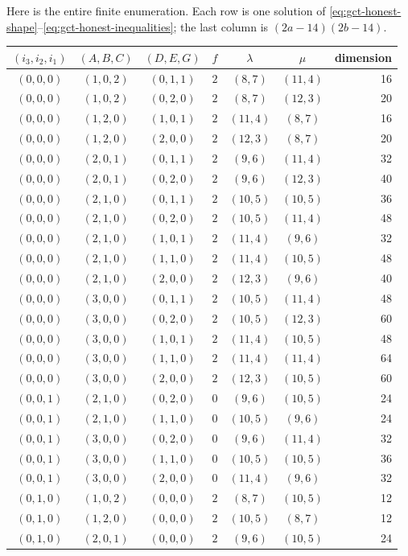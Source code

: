 Here is the entire finite enumeration. Each row is one solution of
\eqref{eq:gct-honest-shape}--\eqref{eq:gct-honest-inequalities};
the last column is $(2a-14)(2b-14)$.
\begin{center}\small
\begin{tabular}{ccccccr}
\toprule
$(i_3,i_2,i_1)$ & $(A,B,C)$ & $(D,E,G)$ & $f$ & $\lambda$ & $\mu$ & dimension\\
\midrule
$(0,0,0)$ & $(1,0,2)$ & $(0,1,1)$ & $2$ & $(8,7)$ & $(11,4)$ & 16\\
$(0,0,0)$ & $(1,0,2)$ & $(0,2,0)$ & $2$ & $(8,7)$ & $(12,3)$ & 20\\
$(0,0,0)$ & $(1,2,0)$ & $(1,0,1)$ & $2$ & $(11,4)$ & $(8,7)$ & 16\\
$(0,0,0)$ & $(1,2,0)$ & $(2,0,0)$ & $2$ & $(12,3)$ & $(8,7)$ & 20\\
$(0,0,0)$ & $(2,0,1)$ & $(0,1,1)$ & $2$ & $(9,6)$ & $(11,4)$ & 32\\
$(0,0,0)$ & $(2,0,1)$ & $(0,2,0)$ & $2$ & $(9,6)$ & $(12,3)$ & 40\\
$(0,0,0)$ & $(2,1,0)$ & $(0,1,1)$ & $2$ & $(10,5)$ & $(10,5)$ & 36\\
$(0,0,0)$ & $(2,1,0)$ & $(0,2,0)$ & $2$ & $(10,5)$ & $(11,4)$ & 48\\
$(0,0,0)$ & $(2,1,0)$ & $(1,0,1)$ & $2$ & $(11,4)$ & $(9,6)$ & 32\\
$(0,0,0)$ & $(2,1,0)$ & $(1,1,0)$ & $2$ & $(11,4)$ & $(10,5)$ & 48\\
$(0,0,0)$ & $(2,1,0)$ & $(2,0,0)$ & $2$ & $(12,3)$ & $(9,6)$ & 40\\
$(0,0,0)$ & $(3,0,0)$ & $(0,1,1)$ & $2$ & $(10,5)$ & $(11,4)$ & 48\\
$(0,0,0)$ & $(3,0,0)$ & $(0,2,0)$ & $2$ & $(10,5)$ & $(12,3)$ & 60\\
$(0,0,0)$ & $(3,0,0)$ & $(1,0,1)$ & $2$ & $(11,4)$ & $(10,5)$ & 48\\
$(0,0,0)$ & $(3,0,0)$ & $(1,1,0)$ & $2$ & $(11,4)$ & $(11,4)$ & 64\\
$(0,0,0)$ & $(3,0,0)$ & $(2,0,0)$ & $2$ & $(12,3)$ & $(10,5)$ & 60\\
$(0,0,1)$ & $(2,1,0)$ & $(0,2,0)$ & $0$ & $(9,6)$ & $(10,5)$ & 24\\
$(0,0,1)$ & $(2,1,0)$ & $(1,1,0)$ & $0$ & $(10,5)$ & $(9,6)$ & 24\\
$(0,0,1)$ & $(3,0,0)$ & $(0,2,0)$ & $0$ & $(9,6)$ & $(11,4)$ & 32\\
$(0,0,1)$ & $(3,0,0)$ & $(1,1,0)$ & $0$ & $(10,5)$ & $(10,5)$ & 36\\
$(0,0,1)$ & $(3,0,0)$ & $(2,0,0)$ & $0$ & $(11,4)$ & $(9,6)$ & 32\\
$(0,1,0)$ & $(1,0,2)$ & $(0,0,0)$ & $2$ & $(8,7)$ & $(10,5)$ & 12\\
$(0,1,0)$ & $(1,2,0)$ & $(0,0,0)$ & $2$ & $(10,5)$ & $(8,7)$ & 12\\
$(0,1,0)$ & $(2,0,1)$ & $(0,0,0)$ & $2$ & $(9,6)$ & $(10,5)$ & 24\\
\bottomrule
\end{tabular}
\end{center}

